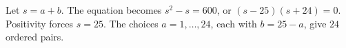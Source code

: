 Let $ s=a+b $. The equation becomes $ s^2-s=600 $, or $(s-25)(s+24)=0 $. Positivity forces $ s=25 $. The choices $ a=1,\ldots,24 $, each with $ b=25-a $, give $\boxed{24}$ ordered pairs.
